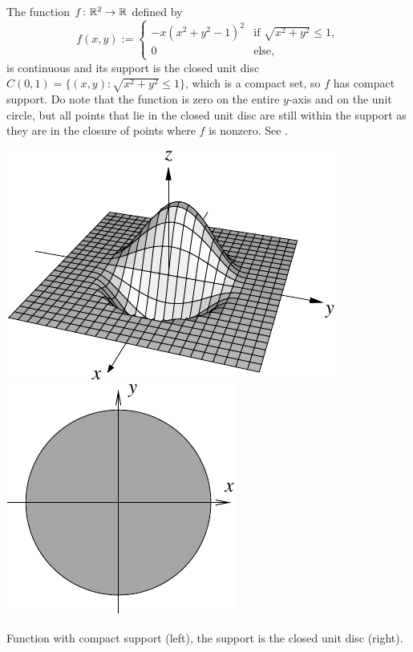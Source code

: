 \begin{example}
The function $f \colon {\mathbb{R}}^2 \to {\mathbb{R}}$ defined by
\begin{equation*}
f(x,y) :=
\begin{cases}
-x{(x^2+y^2-1)}^2 & \text{if $\sqrt{x^2+y^2} \leq 1$}, \\
0 & \text{else},
\end{cases}
\end{equation*}
is continuous and its support is the closed unit disc
$C(0,1) = \bigl\{ (x,y) : \sqrt{x^2 + y^2} \leq 1 \bigr\}$, which is a compact set, so $f$ has compact support.
Do note that the function is zero on the entire $y$-axis
and on the unit circle, but
all points that lie in the closed unit disc are still within the support
as they are in the closure of points where $f$ is nonzero.
See .
\begin{myfigureht}
\includegraphics{figures/compsup}
\qquad
\includegraphics{figures/compsupsup}
\caption{Function with compact support (left), the support
is the closed unit disc (right).\label{fig:compsup}}
\end{myfigureht}
\end{example}

